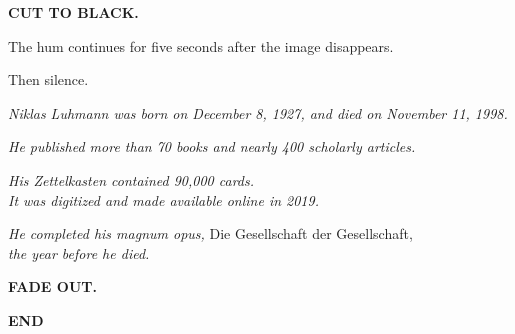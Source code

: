 \documentclass[12pt]{article}
\newcommand{\trans}[1]{%
  \vspace{8pt}%
  \begin{flushright}\textbf{#1}\end{flushright}%
  \vspace{4pt}%
}
\newenvironment{action}{%
  \vspace{4pt}%
  \noindent\ignorespaces%
}{%
  \vspace{6pt}%
}
\begin{document}
\trans{CUT TO BLACK.}

\begin{action}
The hum continues for five seconds after the image disappears.

Then silence.
\end{action}

\bigskip
\bigskip

\begin{center}
\textit{Niklas Luhmann was born on December 8, 1927, and died on November 11, 1998.}

\medskip

\textit{He published more than 70 books and nearly 400 scholarly articles.}

\medskip

\textit{His Zettelkasten contained 90,000 cards.}\\
\textit{It was digitized and made available online in 2019.}

\medskip

\textit{He completed his magnum opus,} Die Gesellschaft der Gesellschaft,\\
\textit{the year before he died.}
\end{center}

\bigskip\bigskip

\begin{center}
\textbf{FADE OUT.}

\bigskip

\textbf{END}
\end{center}
\end{document}
